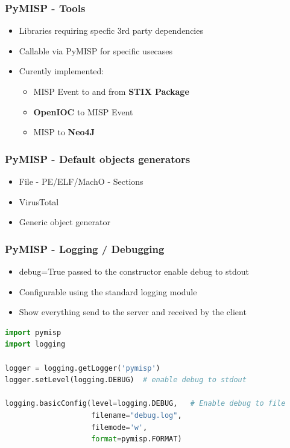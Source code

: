 \begin{frame}[fragile]
    \frametitle{PyMISP - Tools}
    \begin{itemize}
        \item Libraries requiring specfic 3rd party dependencies
        \item Callable via PyMISP for specific usecases
        \item Curently implemented:
        \begin{itemize}
            \item MISP Event to and from {\bf STIX Package}
            \item {\bf OpenIOC} to MISP Event
            \item MISP to {\bf Neo4J}
        \end{itemize}
    \end{itemize}
\end{frame}

\begin{frame}[fragile]
    \frametitle{PyMISP - Default objects generators }
    \begin{itemize}
        \item File - PE/ELF/MachO - Sections
        \item VirusTotal
        \item Generic object generator
    \end{itemize}
\end{frame}

\begin{frame}[fragile]
    \frametitle{PyMISP - Logging / Debugging}
    \begin{itemize}
        \item debug=True passed to the constructor enable debug to stdout
        \item Configurable using the standard logging module
        \item Show everything send to the server and received by the client
    \end{itemize}
\begin{adjustbox}{width=\textwidth,height=3cm,keepaspectratio}
    \begin{lstlisting}[language=Python,firstnumber=1]
import pymisp
import logging

logger = logging.getLogger('pymisp')
logger.setLevel(logging.DEBUG)  # enable debug to stdout

logging.basicConfig(level=logging.DEBUG,   # Enable debug to file
                    filename="debug.log",
                    filemode='w',
                    format=pymisp.FORMAT)
    \end{lstlisting}
\end{adjustbox}
\end{frame}

